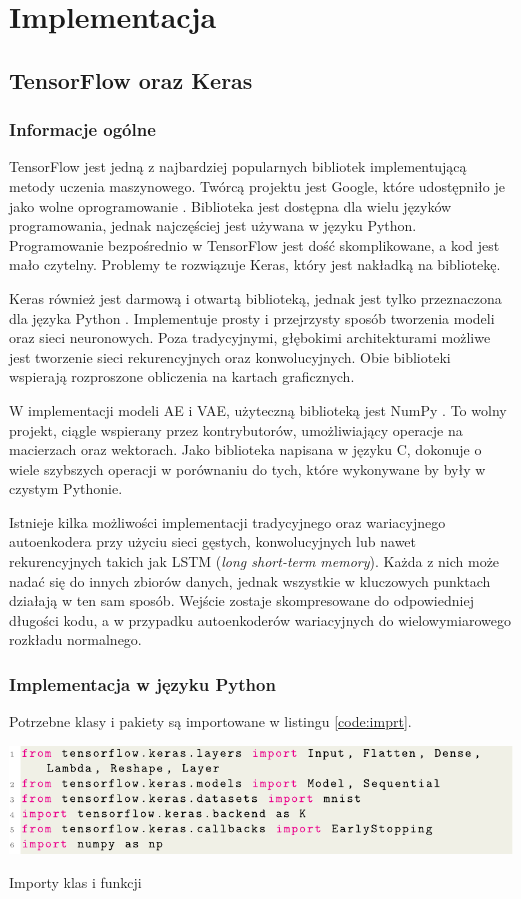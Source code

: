 \documentclass[a4paper,12pt,oneside]{book} %
\begin{document}
\chapter{Implementacja}
\section{TensorFlow oraz Keras}
\subsection{Informacje ogólne}
TensorFlow jest jedną z najbardziej popularnych bibliotek implementującą metody uczenia maszynowego. Twórcą projektu jest Google, które udostępniło je jako wolne oprogramowanie \cite{tensorflow2015-whitepaper}. Biblioteka jest dostępna dla wielu języków programowania, jednak najczęściej jest używana w języku Python. Programowanie bezpośrednio w TensorFlow jest dość skomplikowane, a kod jest mało czytelny. Problemy te rozwiązuje Keras, który jest nakładką na bibliotekę. 

Keras również jest darmową i otwartą biblioteką, jednak jest tylko przeznaczona dla języka Python \cite{chollet2015keras}. Implementuje prosty i przejrzysty sposób tworzenia modeli oraz sieci  neuronowych. Poza tradycyjnymi, głębokimi architekturami możliwe jest tworzenie sieci rekurencyjnych oraz konwolucyjnych. Obie biblioteki wspierają rozproszone obliczenia na kartach graficznych. 

W implementacji modeli AE i VAE, użyteczną biblioteką jest NumPy \cite{numpy}. To wolny projekt, ciągle wspierany przez kontrybutorów, umożliwiający operacje na macierzach oraz wektorach. Jako biblioteka napisana w języku C, dokonuje o wiele szybszych operacji w porównaniu do tych, które wykonywane by były w czystym Pythonie. 

Istnieje kilka możliwości implementacji tradycyjnego oraz wariacyjnego autoenkodera przy użyciu sieci gęstych, konwolucyjnych lub nawet rekurencyjnych takich jak LSTM (\textit{long short-term memory}). Każda z nich może nadać się do innych zbiorów danych, jednak wszystkie w kluczowych punktach działają w ten sam sposób. Wejście zostaje skompresowane do odpowiedniej długości kodu, a w przypadku autoenkoderów wariacyjnych do wielowymiarowego rozkładu normalnego. 
\subsection{Implementacja w języku Python}
Potrzebne klasy i pakiety są importowane w listingu \ref{code:imprt}.
\begin{code}[h!]
	\centering
	\includegraphics[width=\linewidth]{importy.pdf}
	\caption{Importy klas i funkcji}
	\label{code:imprt}
\end{code}
\end{document}
